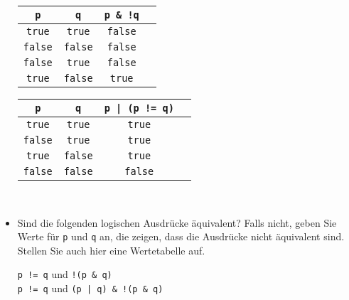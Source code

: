 \documentclass[10pt, oneside]{article}
\begin{document}
\begin{itemize}
    \begin{table*}[h]
        \centering
        \begin{minipage}{.4\linewidth}
            \centering
            \begin{tabular}{|c|c|c|c|}
                \hline
                \verb+p+     & \verb+q+     & \verb+p & !q+ \\
                \hline
                \verb+true+  & \verb+true+  & \verb+false+ \\
                \hline
                \verb+false+ & \verb+false+ & \verb+false+ \\
                \hline
                \verb+false+ & \verb+true+  & \verb+false+ \\
                \hline
                \verb+true+  & \verb+false+ & \verb+true+ \\
                \hline
            \end{tabular}
        \end{minipage}%
        \begin{minipage}{.4\linewidth}
            \centering
            \begin{tabular}{|c|c|c|c|}
                \hline
                \verb+p+     & \verb+q+     & \verb+p | (p != q)+ \\
                \hline
                \verb+true+  & \verb+true+  & \verb+true+ \\
                \hline
                \verb+false+ & \verb+true+  & \verb+true+ \\
                \hline
                \verb+true+  & \verb+false+ & \verb+true+ \\
                \hline
                \verb+false+ & \verb+false+ & \verb+false+ \\
                \hline
            \end{tabular}
        \end{minipage}  \\[15pt]
    \end{table*}

    \item Sind die folgenden logischen Ausdrücke äquivalent? Falls nicht, geben Sie Werte
    für \verb+p+ und \verb+q+ an, die zeigen, dass die Ausdrücke nicht äquivalent
    sind. Stellen Sie auch hier eine Wertetabelle auf.

    \verb+p != q+ und \verb+!(p & q)+ \\
    \verb+p != q+ und \verb+(p | q) & !(p & q)+


\end{itemize}
\end{document}
